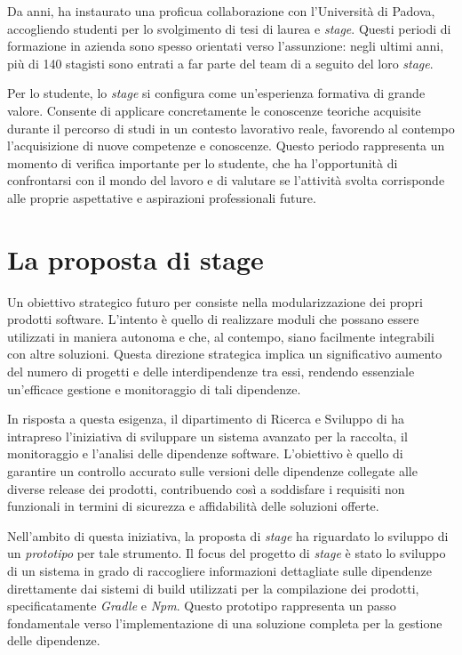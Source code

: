 \noindent Da anni, {\azienda} ha instaurato una proficua collaborazione con l'Università di Padova, accogliendo studenti per lo 
svolgimento di tesi di laurea e \textit{stage}. Questi periodi di formazione in azienda sono spesso orientati verso l'assunzione: negli 
ultimi anni, più di 140 stagisti sono entrati a far parte del team di {\azienda} a seguito del loro \textit{stage}.

Per lo studente, lo \textit{stage} si configura come un'esperienza formativa di grande valore. Consente di applicare concretamente le 
conoscenze teoriche acquisite durante il percorso di studi in un contesto lavorativo reale, favorendo al contempo l'acquisizione 
di nuove competenze e conoscenze. Questo periodo rappresenta un momento di verifica importante per lo studente, che ha l'opportunità 
di confrontarsi con il mondo del lavoro e di valutare se l'attività svolta corrisponde alle proprie aspettative e aspirazioni professionali future.


\section{La proposta di stage}

Un obiettivo strategico futuro per {\azienda} consiste nella modularizzazione dei propri prodotti software. 
L'intento è quello di realizzare moduli che possano essere utilizzati in maniera autonoma e che, al contempo, 
siano facilmente integrabili con altre soluzioni. Questa direzione strategica implica un significativo aumento
del numero di progetti e delle interdipendenze tra essi, rendendo essenziale un'efficace gestione e monitoraggio di tali dipendenze.

In risposta a questa esigenza, il dipartimento di Ricerca e Sviluppo di {\azienda} ha intrapreso l'iniziativa 
di sviluppare un sistema avanzato per la raccolta, il monitoraggio e l'analisi delle dipendenze software. 
L'obiettivo è quello di garantire un controllo accurato sulle versioni delle dipendenze collegate alle diverse release dei prodotti, 
contribuendo così a soddisfare i requisiti non funzionali in termini di sicurezza e affidabilità delle soluzioni offerte.

Nell'ambito di questa iniziativa, la proposta di \textit{stage} ha riguardato lo sviluppo di un \textit{\gls{prototipo}} per tale strumento. 
Il focus del progetto di \textit{stage} è stato lo sviluppo di un sistema in grado di raccogliere informazioni dettagliate sulle dipendenze 
direttamente dai sistemi di build utilizzati per la compilazione dei prodotti, specificatamente \textit{\gls{Gradle}} e \textit{\gls{Npm}}. 
Questo prototipo rappresenta un passo fondamentale verso l'implementazione di una soluzione completa per la gestione delle dipendenze.

